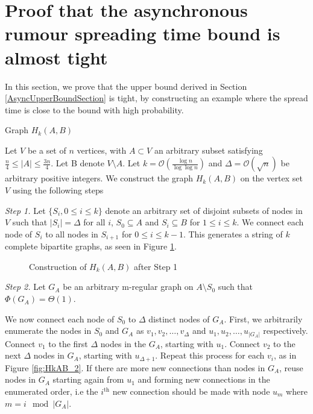 \section{Proof that the asynchronous rumour spreading time bound is almost tight}
\label{section:AsyncLowerBound}

In this section, we prove that the upper bound derived in Section \ref{AsyncUpperBoundSection} is tight, by constructing an example where the spread time is close to the bound with high probability.

\begin{definition}\label{def:HkAB}
 	Graph $H_k(A,B)$

	Let $V$ be a set of $n$ vertices, with $A \subset V$ an arbitrary subset satisfying $\frac{n}{4} \leq |A| \leq \frac{3n}{4}$. %
	Let B denote $V \setminus A$. Let $k = \mathcal{O}\left(\frac{\log n}{\log \log n}\right)$ and $\Delta = \mathcal{O}(\sqrt{n})$ be arbitrary positive integers. We construct the graph $H_k(A,B)$ on the vertex set $V$ using the following steps


	\textit{Step 1.} Let $\{S_i, 0 \leq i \leq k\}$ denote an arbitrary set of disjoint subsets of nodes in $V$ such that $|S_i| = \Delta$ for all $i$, $S_0 \subseteq A$ and $S_i \subseteq B$ for $1 \leq i \leq k$. We connect each node of $S_i$ to all nodes in $S_{i+1}$ for $0 \leq i \leq k - 1$. This generates a string of $k$ complete bipartite graphs, as seen in Figure \ref{fig:HkAB_1}.


    \begin{figure}[h]
        \centering
        
        \caption{Construction of $H_k(A,B)$ after Step 1}
        \label{fig:HkAB_1}
    \end{figure}
    
	\textit{Step 2.} Let $G_A$ be an arbitrary m-regular %
	graph on $A \setminus S_0$ such that $\Phi(G_A) = \Theta(1)$. %


	We now connect each node of $S_0$ to $\Delta$ distinct nodes of $G_A$. First, we arbitrarily enumerate the nodes in $S_0$ and $G_A$ as $v_1, v_2, \dots, v_\Delta$ and $u_1, u_2, \dots, u_{|G_A|}$ respectively. Connect $v_1$ to the first $\Delta$ nodes in the $G_A$, starting with $u_1$. Connect $v_2$ to the next $\Delta$ nodes in $G_A$, starting with $u_{\Delta + 1}$.
	Repeat this process for each $v_i$, as in Figure \ref{fig:HkAB_2}.
	If there are more new connections than nodes in $G_A$, reuse nodes in $G_A$ starting again from $u_1$ and forming new connections in the enumerated order, i.e the $i^\text{th}$ new connection should be made with node $u_m$ where $m = i\mod |G_A|$.


\end{definition}
